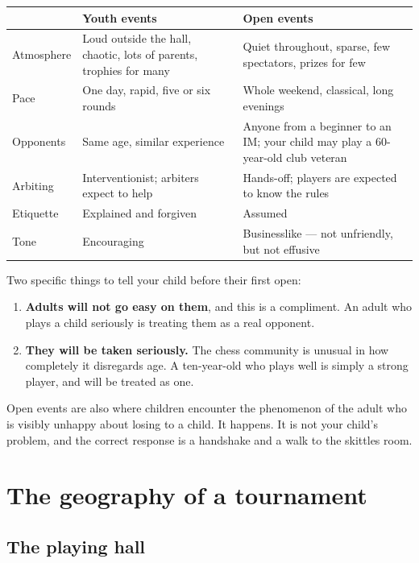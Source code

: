 \documentclass[10pt,letterpaper]{article}
\begin{document}
\begin{center}
\begin{tabularx}{\textwidth}{@{}p{}XX@{}}
\toprule
& \textbf{Youth events} & \textbf{Open events} \\
\midrule
Atmosphere & Loud outside the hall, chaotic, lots of parents, trophies for
many & Quiet throughout, sparse, few spectators, prizes for few \\
Pace & One day, rapid, five or six rounds & Whole weekend, classical, long
evenings \\
Opponents & Same age, similar experience & Anyone from a beginner to an IM;
your child may play a 60-year-old club veteran \\
Arbiting & Interventionist; arbiters expect to help & Hands-off; players are
expected to know the rules \\
Etiquette & Explained and forgiven & Assumed \\
Tone & Encouraging & Businesslike --- not unfriendly, but not effusive \\
\bottomrule
\end{tabularx}
\end{center}

Two specific things to tell your child before their first open:

\begin{enumerate}
  \item \textbf{Adults will not go easy on them}, and this is a compliment. An
        adult who plays a child seriously is treating them as a real opponent.
  \item \textbf{They will be taken seriously.} The chess community is unusual in
        how completely it disregards age. A ten-year-old who plays well is
        simply a strong player, and will be treated as one.
\end{enumerate}

Open events are also where children encounter the phenomenon of the adult who is
visibly unhappy about losing to a child. It happens. It is not your child's
problem, and the correct response is a handshake and a walk to the skittles room.

\section{The geography of a tournament}

\subsection{The playing hall}
\end{document}
